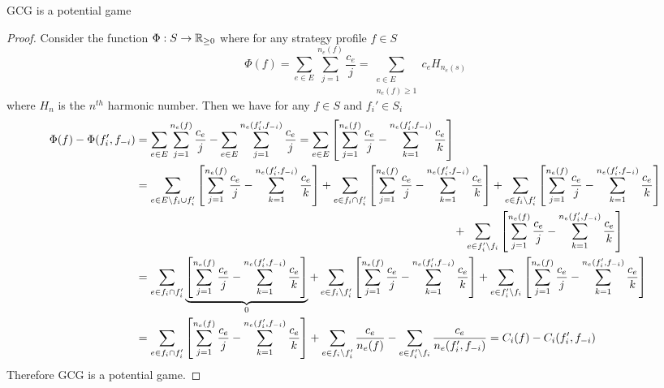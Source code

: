 \begin{lemma}{}{}
	GCG is a potential game
\end{lemma}
\begin{proof}
	Consider the function $\Phi:S\to \mathbb{R}_{\geq 0}$ where for any strategy profile $f\in S$  $$\Phi(f)=\sum\limits_{e\in E}\sum\limits_{j=1}^{n_e(f)}\frac{c_e}{j}=\sum\limits_{\substack{e\in E\\ n_e(f)\geq 1}}c_eH_{n_e(s)}$$where $H_n$ is the $n^{th}$ harmonic number. Then we  have for any $f\in S$ and $f_i'\in S_i$ \begin{align*}
		\Phi(f)-\Phi(f_i',f_{-i}) & =\sum\limits_{e\in E}\sum\limits_{j=1}^{n_e(f)}\frac{c_e}{j}-\sum\limits_{e\in E}\sum\limits_{j=1}^{n_e(f_i',f_{-i})}\frac{c_e}{j}      =\sum\limits_{e\in E}\left[\sum\limits_{j=1}^{n_e(f)}\frac{c_e}{j}-\sum\limits_{k=1}^{n_e(f_i',f_{-i})}\frac{c_e}{k}\right]                                                                                                                                                         \\
		                          & = \sum\limits_{e\in E\setminus f_i\cup f_i'}\left[\sum\limits_{j=1}^{n_e(f)}\frac{c_e}{j}-\sum\limits_{k=1}^{n_e(f_i',f_{-i})}\frac{c_e}{k}\right]+\sum\limits_{e\in f_i\cap f_{i}'}\left[\sum\limits_{j=1}^{n_e(f)}\frac{c_e}{j}-\sum\limits_{k=1}^{n_e(f_i',f_{-i})}\frac{c_e}{k}\right]+\sum\limits_{e\in f_i\setminus f_i'}\left[\sum\limits_{j=1}^{n_e(f)}\frac{c_e}{j}-\sum\limits_{k=1}^{n_e(f_i',f_{-i})}\frac{c_e}{k}\right] \\
		                          & \qquad\qquad\qquad\qquad\qquad\qquad\qquad\qquad\qquad\qquad\qquad\qquad\qquad\qquad+\sum\limits_{e\in f_i'\setminus f_i}\left[\sum\limits_{j=1}^{n_e(f)}\frac{c_e}{j}-\sum\limits_{k=1}^{n_e(f_i',f_{-i})}\frac{c_e}{k}\right]                                                                                                                                                                                             \\
		                          & =\sum\limits_{e\in f_i\cap f_{i}'}\underbrace{\left[\sum\limits_{j=1}^{n_e(f)}\frac{c_e}{j}-\sum\limits_{k=1}^{n_e(f_i',f_{-i})}\frac{c_e}{k}\right]}_{0}+\sum\limits_{e\in f_i\setminus f_i'}\left[\sum\limits_{j=1}^{n_e(f)}\frac{c_e}{j}-\sum\limits_{k=1}^{n_e(f_i',f_{-i})}\frac{c_e}{k}\right] +\sum\limits_{e\in f_i'\setminus f_i}\left[\sum\limits_{j=1}^{n_e(f)}\frac{c_e}{j}-\sum\limits_{k=1}^{n_e(f_i',f_{-i})}\frac{c_e}{k}\right]\\
		                          &=\sum\limits_{e\in f_i\cap f_{i}'}\left[\sum\limits_{j=1}^{n_e(f)}\frac{c_e}{j}-\sum\limits_{k=1}^{n_e(f_i',f_{-i})}\frac{c_e}{k}\right]+\sum\limits_{e\in f_i\setminus f_i'}\frac{c_e}{n_e(f)} -\sum\limits_{e\in f_i'\setminus f_i}\frac{c_e}{n_e(f_i',f_{-i})} = C_i(f)-C_i(f_i',f_{-i})
	\end{align*}
Therefore GCG is a potential game.
\end{proof}
